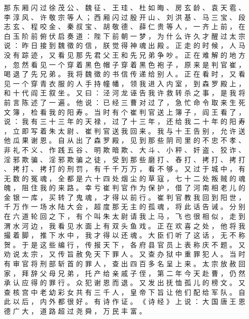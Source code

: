 {那 东 厢 闪 过 徐 茂 公 、 魏 征 、 王 珪 、 杜 如 晦 、 房 玄 龄 、 袁 天 雹 、 李 淳 风 、 许 敬 宗 等 人 ； 西 厢 闪 过 殷 开 山 、 刘 洪 基 、 马 三 宝 、 段 志 玄 、 程 咬 金 、 秦 叔 宝 、 胡 敬 德 、 薛 仁 贵 等 人 ， 一 齐 上 前 ， 在 白 玉 阶 前 俯 伏 启 奏 道 ： 陛 下 前 朝 一 梦 ， 为 什 么 许 久 才 醒 过 太 宗 说 ： 昨 日 接 到 魏 徵 的 信 ， 朕 觉 得 神 魂 出 殿 。
正 走 的 时 候 ， 人 马 没 有 踪 迹 ， 又 看 见 那 先 君 父 王 和 先 兄 弟 争 吵 。
正 在 难 解 的 地 方 ， 忽 然 看 见 一 个 穿 着 黑 色 帽 子 穿 着 黑 色 袍 子 ， 原 来 是 判 官 崔 ， 喝 退 了 先 兄 弟 。
我 将 魏 徵 的 书 信 传 递 给 别 人 。
正 在 看 时 ， 又 看 见 一 个 穿 青 衣 服 的 人 手 持 幢 幡 ， 领 我 进 入 内 室 ， 到 森 罗 殿 上 ， 和 十 代 阎 王 叙 坐 。
又 曰 ： 泾 河 龙 诬 告 我 许 救 转 杀 之 事 ， 是 我 将 前 言 陈 述 了 一 遍 。
他 说 ： 已 经 三 曹 对 过 了 ， 急 忙 命 令 取 来 生 死 文 簿 ， 检 看 我 的 阳 寿 。
当 时 有 个 崔 判 官 送 上 簿 子 ， 阎 王 看 了 ， 说 ： 我 有 三 十 三 年 的 天 禄 ， 过 了 十 三 年 ， 还 给 我 二 十 年 的 阳 寿 ， 立 即 写 着 朱 太 尉 、 崔 判 官 送 我 回 来 。
我 与 十 王 告 别 ， 允 许 送 他 瓜 果 谢 恩 。
自 从 出 了 森 罗 殿 ， 见 到 那 些 阴 司 里 的 不 忠 不 孝 、 非 礼 不 义 、 作 践 五 谷 、 明 欺 暗 欺 、 大 斗 、 小 秤 、 奸 盗 、 狡 诈 、 淫 邪 欺 骗 、 淫 邪 欺 骗 之 徒 ， 受 到 那 些 磨 打 、 舂 打 、 拷 打 、 拷 打 、 拷 打 、 拷 打 的 刑 罚 ， 有 千 千 万 万 ， 看 不 够 。
又 过 于 城 中 ， 有 无 数 的 冤 魂 ， 全 都 是 六 十 四 处 烟 尘 的 草 寇 ， 七 十 二 处 叛 贼 的 魂 魄 ， 阻 住 我 的 来 路 。
幸 亏 崔 判 官 作 为 保 护 ， 借 了 河 南 相 老 儿 的 金 银 一 库 ， 买 转 了 鬼 魂 ， 才 得 以 前 行 。
崔 判 官 教 我 回 到 阳 世 ， 千 万 作 一 场 水 陆 大 会 ， 超 度 那 无 主 的 孤 魂 ， 将 此 话 告 诫 。
分 别 在 六 道 轮 回 之 下 ， 有 个 叫 朱 太 尉 请 我 上 马 ， 飞 也 很 相 似 ， 走 到 渭 水 河 边 ， 我 看 见 水 面 上 有 双 头 鱼 戏 。
正 在 欢 喜 之 处 ， 他 将 我 撮 着 脚 ， 推 下 水 中 ， 我 才 得 以 还 魂 。
大 臣 们 听 了 这 话 ， 无 不 称 贺 。
于 是 这 些 编 行 ， 传 报 天 下 ， 各 府 县 官 员 上 表 称 庆 不 题 。
又 劝 说 太 宗 ， 又 传 旨 赦 免 天 下 罪 人 。
又 查 办 狱 中 重 罪 犯 人 。
当 时 有 审 官 将 刑 部 斩 首 的 罪 人 ， 查 出 四 百 多 名 呈 上 来 。
太 宗 放 赦 回 家 ， 拜 辞 父 母 兄 弟 ， 托 产 给 亲 戚 子 侄 ， 第 二 年 今 天 赴 曹 ， 仍 然 承 认 应 得 的 罪 行 。
众 犯 谢 恩 而 退 。
又 发 出 抚 恤 孤 儿 的 榜 文 。
又 查 核 宫 中 老 幼 彩 女 共 有 三 千 人 ， 皇 帝 下 旨 让 他 们 配 给 军 队 。
自 此 以 后 ， 内 外 都 很 好 。
有 诗 作 证 。
《 诗 经 》 上 说 ： 大 国 唐 王 恩 德 广 大 ， 道 路 超 过 尧 舜 ， 万 民 丰 富 。
}
